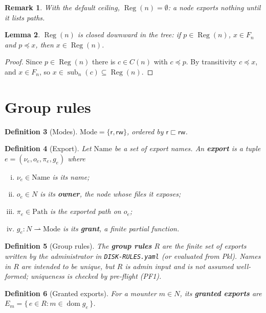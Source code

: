 \documentclass[11pt]{article}
\newcommand{\Path}{\text{Path}}
\DeclareMathOperator{\sub}{sub}
\DeclareMathOperator{\Reg}{Reg}
\DeclareMathOperator{\dom}{dom}
\newcommand{\Name}{\text{Name}}
\newcommand{\Mode}{\text{Mode}}
\newcommand{\Rd}{\mathsf{r}}
\newcommand{\RW}{\mathsf{rw}}
\newcommand{\PF}[1]{\textsf{PF#1}}
\theoremstyle{definitionbreak}
\newtheorem{definition}{Definition}[section]
\theoremstyle{plainbreak}
\newtheorem{lemma}[definition]{Lemma}
\theoremstyle{remarkbreak}
\newtheorem{remark}[definition]{Remark}
\begin{document}
\begin{remark}
With the default ceiling, $\Reg(n) = \emptyset$: a node exports nothing until it lists paths.
\end{remark}

\begin{lemma}\label{lem:reg-upward}
$\Reg(n)$ is closed downward in the tree: if $p \in \Reg(n)$, $x \in F_n$ and $p \preceq x$,
then $x \in \Reg(n)$.
\end{lemma}

\begin{proof}
Since $p \in \Reg(n)$ there is $c \in C(n)$ with $c \preceq p$. By transitivity $c \preceq x$,
and $x \in F_n$, so $x \in \sub_n(c) \subseteq \Reg(n)$.
\end{proof}

\section{Group rules}

\begin{definition}[Modes]
$\Mode = \{\Rd, \RW\}$, ordered by $\Rd \sqsubset \RW$.
\end{definition}

\begin{definition}[Export]
Let $\Name$ be a set of export names. An \textbf{export} is a tuple
$e = (\nu_e, o_e, \pi_e, g_e)$ where
\begin{enumerate}[(i)]
    \item $\nu_e \in \Name$ is its name;
    \item $o_e \in N$ is its \textbf{owner}, the node whose files it exposes;
    \item $\pi_e \in \Path$ is the exported path on $o_e$;
    \item $g_e : N \rightharpoonup \Mode$ is its \textbf{grant}, a finite partial function.
\end{enumerate}
\end{definition}

\begin{definition}[Group rules]
The \textbf{group rules} $R$ are the finite set of exports written by the administrator in
\texttt{DISK-RULES.yaml} (or evaluated from Pkl). Names in $R$ are \emph{intended} to be unique,
but $R$ is admin input and is not assumed well-formed; uniqueness is checked by pre-flight
(\PF{1}).
\end{definition}

\begin{definition}[Granted exports]
For a mounter $m \in N$, its \textbf{granted exports} are
$E_m = \{\, e \in R : m \in \dom g_e \,\}$.
\end{definition}
\end{document}
